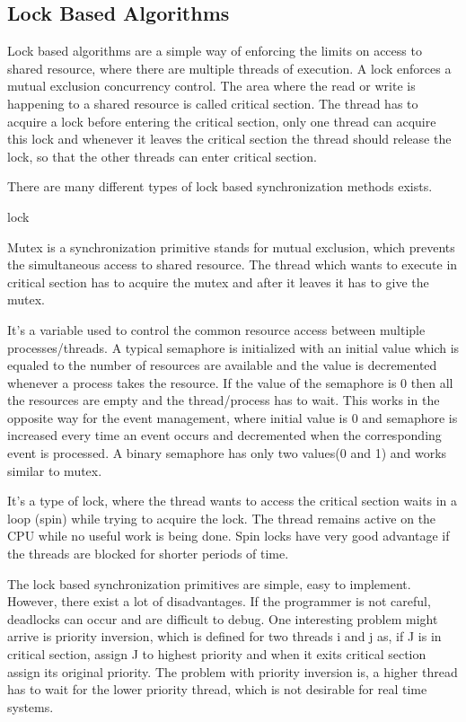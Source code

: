 \subsection{Lock Based Algorithms}
Lock based algorithms are a simple way of enforcing the limits on access to shared resource, where there are multiple threads of execution. A lock enforces a mutual exclusion concurrency control. The area where the read or write is happening to a shared resource is called critical section. The thread has to acquire a lock before entering the critical section, only one thread can acquire this lock and whenever it leaves the critical section the thread should release the lock, so that the other threads can enter critical section.

There are many different types of lock based synchronization methods exists.

\begin{labeling}{lock}
\item[Mutex] Mutex is a synchronization primitive stands for mutual exclusion, which prevents the simultaneous access to shared resource. The thread which wants to execute in critical section has to acquire the mutex and after it leaves it has to give the mutex. 

\item[Semaphore] It's a variable used to control the common resource access between multiple processes/threads. A typical semaphore is initialized with an initial value which is equaled to the number of resources are available and the value is decremented whenever a process takes the resource. If the value of the semaphore is 0 then all the resources are empty and the thread/process has to wait. This works in the opposite way for the event management, where initial value is 0 and semaphore is increased every time an event occurs and decremented when the corresponding event is processed. A binary semaphore has only two values(0 and 1) and works similar to mutex.   

\item[Spin-lock] It's a type of lock, where the thread wants to access the critical section waits in a loop (spin) while trying to acquire the lock. The thread remains active on the CPU while no useful work is being done. Spin locks have very good advantage if the threads are blocked for shorter periods of time.
\end{labeling} 

The lock based synchronization primitives are simple, easy to implement. However, there exist a lot of disadvantages. If the programmer is not careful, deadlocks can occur and are difficult to debug. One interesting problem might arrive is priority inversion, which is defined for two threads i and j as, if J is in critical section, assign J to highest priority and when it exits critical section assign its original priority. The problem with priority inversion is, a higher thread has to wait for the lower priority thread, which is not desirable for real time systems. 

